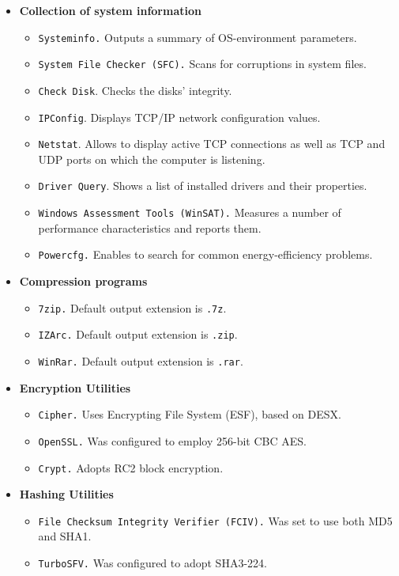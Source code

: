 \begin{itemize}
\item \textbf{Collection of system information}
	   \begin{itemize}
	   \item \texttt{Systeminfo.} Outputs a summary of OS-environment parameters. 
	   \item \texttt{System File Checker (SFC).} Scans for corruptions in system files.
	   \item \texttt{Check Disk}. Checks the disks' integrity.
	   \item \texttt{IPConfig}. Displays TCP/IP network configuration values.
	   \item \texttt{Netstat}. Allows to display active TCP connections as well as TCP and UDP ports on which the computer is listening.
	   \item \texttt{Driver Query}. Shows a list of installed drivers and their properties.
	   \item \texttt{Windows Assessment Tools (WinSAT).} Measures a number of performance characteristics and reports them.
	   \item \texttt{Powercfg.} Enables to search for common energy-efficiency problems. 
	   \end{itemize}
\item \textbf{Compression programs}
		\begin{itemize}
		\item \texttt{7zip.} Default output extension is \texttt{.7z}.
		\item \texttt{IZArc.} Default output extension is \texttt{.zip}.
		\item \texttt{WinRar.} Default output extension is \texttt{.rar}.
		\end{itemize}
\item \textbf{Encryption Utilities}
		\begin{itemize}
		\item \texttt{Cipher.} Uses Encrypting File System (ESF), based on DESX. 
		\item \texttt{OpenSSL.} Was configured to employ 256-bit CBC AES.
		\item \texttt{Crypt.} Adopts RC2 block encryption.
		\end{itemize}
\item \textbf{Hashing Utilities}
		\begin{itemize}
		\item \texttt{File Checksum Integrity Verifier (FCIV).} Was set to use both MD5 and SHA1.
		\item \texttt{TurboSFV.} Was configured to adopt SHA3-224. 
		\end{itemize}
\end{itemize}

